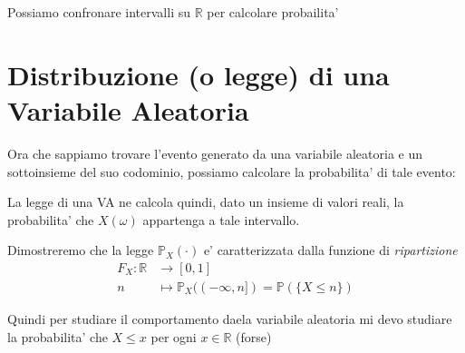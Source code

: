    Possiamo confronare intervalli su $ \mathbb{R} $ per calcolare probailita'

 \section{Distribuzione (o legge) di una Variabile Aleatoria}

 Ora che sappiamo trovare l'evento generato da una variabile aleatoria e un sottoinsieme del suo codominio, possiamo calcolare la probabilita' di tale evento: 

 La legge di una VA ne calcola quindi, dato un insieme di valori reali, la probabilita' che $ X(\omega) $ appartenga a tale intervallo.


 Dimostreremo che la legge $ \mathbb{P}_X(\cdot) $ e' caratterizzata dalla funzione di \textit{ripartizione}
  \begin{align*}
    F_X: \mathbb{R} &\to [0,1]\\
    n &\mapsto \mathbb{P}_X((-\infty, n]) = \mathbb{P}(\{X \leq n\})
  \end{align*}

  Quindi per studiare il comportamento daela variabile aleatoria mi devo studiare la probabilita' che $ X \leq x $ per ogni $ x \in \mathbb{R} $ (forse)

